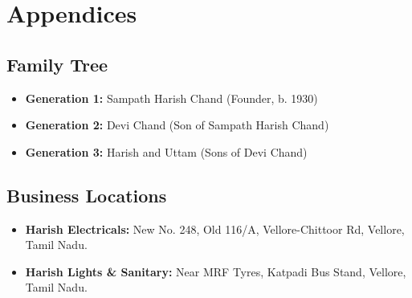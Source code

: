 \documentclass[a4paper,12pt]{report}
\begin{document}
\chapter{Appendices}

\section{Family Tree}
\begin{itemize}
    \item \textbf{Generation 1:} Sampath Harish Chand (Founder, b. 1930)
    \item \textbf{Generation 2:} Devi Chand (Son of Sampath Harish Chand)
    \item \textbf{Generation 3:} Harish and Uttam (Sons of Devi Chand)
\end{itemize}

\section{Business Locations}
\begin{itemize}
    \item \textbf{Harish Electricals:} New No. 248, Old 116/A, Vellore-Chittoor Rd, Vellore, Tamil Nadu.
    \item \textbf{Harish Lights \& Sanitary:} Near MRF Tyres, Katpadi Bus Stand, Vellore, Tamil Nadu.
\end{itemize}
\end{document}
